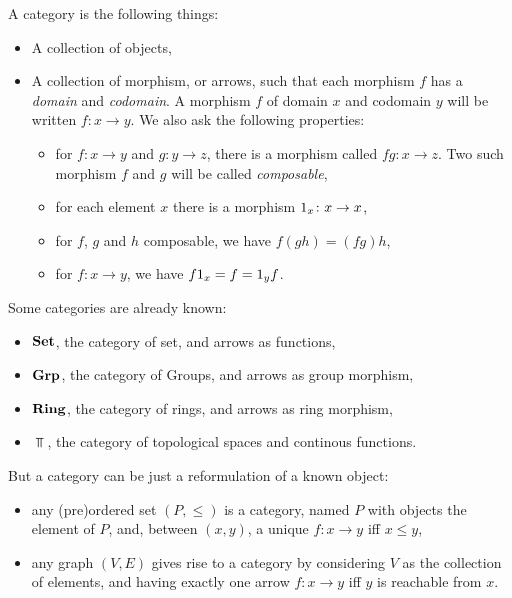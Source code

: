 \documentclass[a4paper]{article}
\theoremstyle { remark }
\theoremstyle { definition }
\newtheorem { definition } { Definition }
\newtheorem { example } { Example }
\theoremstyle { plain }
\begin{document}
\begin{definition}[Category]
A category is the following things:
\begin{itemize}
  \item A collection of objects,
  \item A collection of morphism, or arrows, such that each morphism \( f \) has a \emph{domain} and \emph{codomain}.
    A morphism \( f \) of domain \( x \) and codomain \( y \) will be written \( f \colon x \to y \).
    We also ask the following properties:
    \begin{itemize}
        \item for \( f \colon x \to y \) and \( g \colon y \to z \), there is a morphism called \( fg \colon x \to z \).
          Two such morphism \( f \) and \( g \) will be called \emph{composable},
        \item for each element \( x \) there is a morphism \( \one[x] \colon x \to x \),
        \item for \( f \), \( g \) and \( h \) composable, we have \( f(gh) = (fg)h \),
        \item for \( f \colon x \to y \), we have \( f \one[x] = f = \one[y] f \).
    \end{itemize}
\end{itemize}
\end{definition}

\begin{example}
Some categories are already known:
\begin{itemize}
  \item \(  \mathbf { Set }  \), the category of set, and arrows as functions,
  \item \(  \mathbf { Grp }  \), the category of Groups, and arrows as group morphism,
  \item \(  \mathbf { Ring }  \), the category of rings, and arrows as ring morphism,
  \item \( \Top \), the category of topological spaces and continous functions.
\end{itemize}

But a category can be just a reformulation of a known object: 
\begin{itemize}
  \item any (pre)ordered set \( (P, \leq) \) is a category, named \( P \) with objects the element of \( P \), and, between \( (x, y) \), a unique \( f \colon x \to y \) iff \( x \leq y \),
  \item any graph \( (V, E) \) gives rise to a category by considering \( V \) as the collection of elements, and having exactly one arrow \( f \colon x \to y \) iff \( y \) is reachable from \( x \).
\end{itemize}
\end{example}
\end{document}

